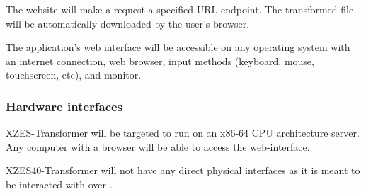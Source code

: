 The website will make a  request a specified URL endpoint.
The transformed file will be automatically downloaded by the user's browser. 

The application's web interface will be accessible on any operating system with an internet connection, web browser, input methods (keyboard, mouse, touchscreen, etc), and monitor.


\subsubsection{Hardware interfaces}

XZES-Transformer will be targeted to run on an x86-64 CPU architecture server.
Any computer with a browser will be able to access the web-interface.

XZES40-Transformer will not have any direct physical interfaces as it is meant to be interacted with over .


